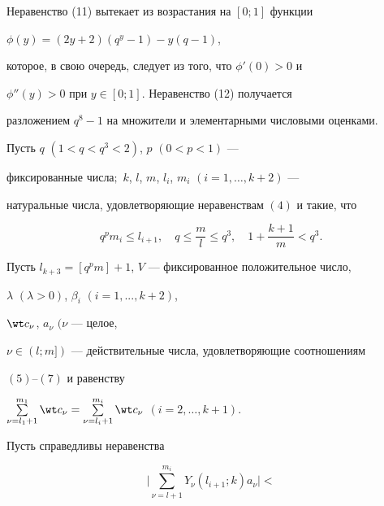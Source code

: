  


Неравенство (11) вытекает из возрастания на $[0;1]$ функции


$\phi(y)=(2y+2)(q^y -1)-y(q -1)$, 


которое, в свою очередь, следует из того, что $\phi'(0)>0$ и 


$\phi''(y)>0$ при $y\in [0;1]$. Неравенство (12) получается 


разложением $q^8-1$ на множители и элементарными числовыми оценками.








\begin{lem}


Пусть $q$ $(1<q<q^3<2)$, $p$ $(0<p<1)$ ---


фиксированные числа\/$;$ $k$, $l$, $m$, $l_i$, $m_i$ $(i=1, \dotsc, k+2)$ --- 


натуральные числа, удовлетворяющие неравенствам $(4)$ и такие, что


\begin{equation}


q^p m_i \le l_{i+1}, \quad q \le \frac{m}{l} \le q^3,


\quad 1+\frac{k+1}{m}<q^3.


\end{equation}





Пусть $l_{k+3}=[q^p m]+1$, $V$ --- фиксированное положительное число,


$\lambda$ $(\lambda{>}0)$, $\beta_i$ $(i{=}1,..., k{+}2)$,




$\wt c_{\nu}$, $a_{\nu}$ $(\nu$ --- целое,


$\nu \in (l; m])$ --- действительные числа, удовлетворяющие соотношениям


$(5)$--$(7)$ и равенству


$\sum\limits_{\nu=l_1+1}^{m_1}\wt c_{\nu}=\sum\limits_{\nu=l_i+1}^{m_i}


\wt c_{\nu}$ $(i=2, \dotsc, k+1)$. 





Пусть справедливы неравенства


\begin{equation}


\bigg|\sum_{\nu=l+1}^{m_i} Y_{\nu}(l_{i+1}; k) a_{\nu} \bigg|<



\end{equation}
\end{lem}
